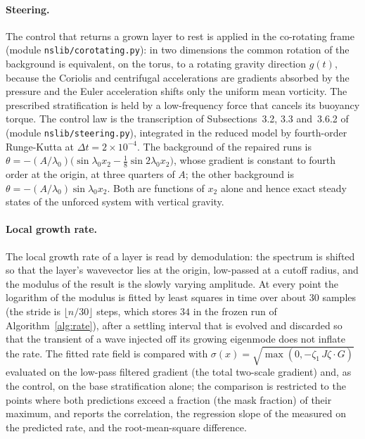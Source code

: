 \documentclass[11pt]{article}
\theoremstyle{remark}
\newcommand{\fp}[1]{\nolinkurl{#1}}
\begin{document}
\paragraph{Steering.} The control that returns a grown layer to rest is applied in the co-rotating frame
(module \fp{nslib/corotating.py}): in two dimensions the common rotation of the background is
equivalent, on the torus, to a rotating gravity direction $g(t)$, because the Coriolis and
centrifugal accelerations are gradients absorbed by the pressure and the Euler acceleration shifts only
the uniform mean vorticity. The prescribed stratification is held by a low-frequency force that cancels
its buoyancy torque. The control law is the transcription of Subsections~3.2, 3.3 and~3.6.2
of~\cite{ab-boussinesq} (module \fp{nslib/steering.py}), integrated in the reduced model by
fourth-order Runge-Kutta at $\Delta t=2\times10^{-4}$. The background of the repaired runs is
$\theta=-(A/\lambda_{0})\bigl(\sin\lambda_{0}x_{2}-\tfrac18\sin2\lambda_{0}x_{2}\bigr)$, whose gradient is
constant to fourth order at the origin, at three quarters of $A$; the other background is
$\theta=-(A/\lambda_{0})\sin\lambda_{0}x_{2}$. Both are functions of $x_{2}$ alone and hence exact steady
states of the unforced system with vertical gravity.

\paragraph{Local growth rate.} The local growth rate of a layer is read by demodulation: the spectrum is
shifted so that the layer's wavevector lies at the origin, low-passed at a cutoff radius, and the
modulus of the result is the slowly varying amplitude. At every point the logarithm of the modulus is
fitted by least squares in time over about $30$ samples (the stride is $\lfloor n/30\rfloor$ steps, which stores $34$ in the frozen run of Algorithm~\ref{alg:rate}), after a settling interval that is evolved and
discarded so that the transient of a wave injected off its growing eigenmode does not inflate the
rate. The fitted rate field is compared with $\sigma(x)=\sqrt{\max(0,-\zeta_{1}\,J\zeta\cdot G)}$
evaluated on the low-pass filtered gradient (the total two-scale gradient) and, as the control, on the
base stratification alone; the comparison is restricted to the points where both predictions exceed a
fraction (the mask fraction) of their maximum, and reports the correlation, the regression slope of
the measured on the predicted rate, and the root-mean-square difference.
\end{document}
